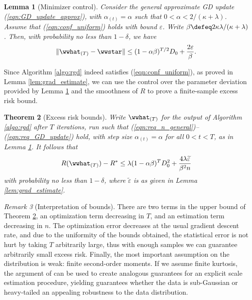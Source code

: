 \documentclass[11pt,oneside]{article}
\theoremstyle{definition} \newtheorem{defn}{Definition}       %
\theoremstyle{plain} \newtheorem{prop}[defn]{Proposition}           %
\theoremstyle{plain} \newtheorem{thm}[defn]{Theorem}                %
\theoremstyle{plain} \newtheorem{lem}[defn]{Lemma}                  %
\theoremstyle{plain} \newtheorem{cor}[defn]{Corollary}              %
\theoremstyle{remark} \newtheorem{rmk}[defn]{Remark}                %
\theoremstyle{remark} \newtheorem{ex}[defn]{Example}                %
\begin{document}
\begin{lem}[Minimizer control]\label{lem:dueling_strong}
Consider the general approximate GD update (\ref{eqn:GD_update_approx}), with $\alpha_{(t)}=\alpha$ such that $0 < \alpha < 2/(\kappa+\lambda)$. Assume that (\ref{eqn:conf_uniform}) holds with bound $\varepsilon$. Write $\beta \defeq 2\kappa\lambda/(\kappa+\lambda)$. Then, with probability no less than $1-\delta$, we have
%
\begin{align*}
\|\wwhat_{(T)}-\wwstar\| \leq (1-\alpha\beta)^{T/2}D_{0} + \frac{2\varepsilon}{\beta}.
\end{align*}
\end{lem}
%
\noindent Since Algorithm \ref{algo:rgd} indeed satisfies (\ref{eqn:conf_uniform}), as proved in Lemma \ref{lem:grad_estimate}, we can use the control over the parameter deviation provided by Lemma \ref{lem:dueling_strong} and the smoothness of $R$ to prove a finite-sample excess risk bound.
%
\begin{thm}[Excess risk bounds]\label{thm:main_Rbound_strong}
Write $\wwhat_{(T)}$ for the output of Algorithm \ref{algo:rgd} after $T$ iterations, run such that (\ref{eqn:req_n_general})--(\ref{eqn:req_GD_update}) hold, with step size $\alpha_{(t)}=\alpha$ for all $0<t<T$, as in Lemma \ref{lem:dueling_strong}. It follows that
%
\begin{align*}
R(\wwhat_{(T)})-R^{\ast} \leq \lambda(1-\alpha\beta)^{T}D_{0}^{2} + \frac{4\lambda \widetilde{\varepsilon}}{\beta^{2} n}
\end{align*}
%
with probability no less than $1-\delta$, where $\widetilde{\varepsilon}$ is as given in Lemma \ref{lem:grad_estimate}.
\end{thm}

\begin{rmk}[Interpretation of bounds]
There are two terms in the upper bound of Theorem \ref{thm:main_Rbound_strong}, an optimization term decreasing in $T$, and an estimation term decreasing in $n$. The optimization error decreases at the usual gradient descent rate, and due to the uniformity of the bounds obtained, the statistical error is not hurt by taking $T$ arbitrarily large, thus with enough samples we can guarantee arbitrarily small excess risk. Finally, the most important assumption on the distribution is weak: finite second-order moments. If we assume finite kurtosis, the argument of \citet{catoni2012a} can be used to create analogous guarantees for an explicit scale estimation procedure, yielding guarantees whether the data is sub-Gaussian or heavy-tailed an appealing robustness to the data distribution.
\end{rmk}
\end{document}
